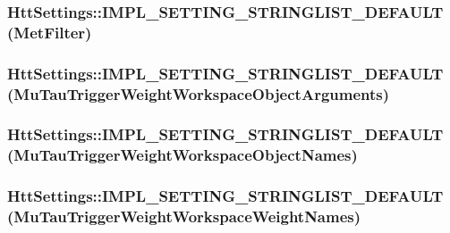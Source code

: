 \hypertarget{classHttSettings_a3eeb2b6787abd3fbdda4854e283adfdf}{
\subsubsection[{IMPL\_\-SETTING\_\-STRINGLIST\_\-DEFAULT}]{\setlength{\rightskip}{0pt plus 5cm}HttSettings::IMPL\_\-SETTING\_\-STRINGLIST\_\-DEFAULT ({\bf MetFilter})}}
\label{classHttSettings_a3eeb2b6787abd3fbdda4854e283adfdf}
\hypertarget{classHttSettings_abab0cd9af3ee87219628f8803c6e1b89}{
\subsubsection[{IMPL\_\-SETTING\_\-STRINGLIST\_\-DEFAULT}]{\setlength{\rightskip}{0pt plus 5cm}HttSettings::IMPL\_\-SETTING\_\-STRINGLIST\_\-DEFAULT (MuTauTriggerWeightWorkspaceObjectArguments)}}
\label{classHttSettings_abab0cd9af3ee87219628f8803c6e1b89}
\hypertarget{classHttSettings_a387e195dada120611ad08764bf90f172}{
\subsubsection[{IMPL\_\-SETTING\_\-STRINGLIST\_\-DEFAULT}]{\setlength{\rightskip}{0pt plus 5cm}HttSettings::IMPL\_\-SETTING\_\-STRINGLIST\_\-DEFAULT (MuTauTriggerWeightWorkspaceObjectNames)}}
\label{classHttSettings_a387e195dada120611ad08764bf90f172}
\hypertarget{classHttSettings_a9256889e237953b72db38e53aaf3396d}{
\subsubsection[{IMPL\_\-SETTING\_\-STRINGLIST\_\-DEFAULT}]{\setlength{\rightskip}{0pt plus 5cm}HttSettings::IMPL\_\-SETTING\_\-STRINGLIST\_\-DEFAULT (MuTauTriggerWeightWorkspaceWeightNames)}}
